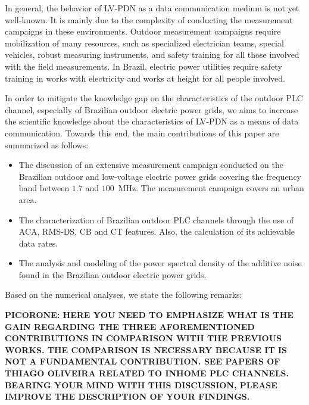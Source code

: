 \documentclass[journal]{IEEEtran}
\begin{document}
	\color{red} In general, the behavior of \ac{LV-PDN} as a data communication medium is not yet well-known. It is mainly due to the complexity of conducting the measurement campaigns in these environments. Outdoor measurement campaigns require mobilization of many resources, such as specialized electrician teams, special vehicles, robust measuring instruments, and safety training for all those involved with the field measurements. In Brazil, electric power utilities require safety training in works with electricity \cite{NR10} and works at height \cite{NR35} for all people involved. 
	
	In order to mitigate the knowledge gap on the characteristics of the outdoor PLC channel, especially of Brazilian outdoor electric power grids, we aims to increase the scientific knowledge about the characteristics of \ac{LV-PDN} as a means of data communication. Towards this end, the main contributions of this paper are summarized as follows:\color{black}
	\begin{itemize}
		\item The discussion of an extensive measurement campaign conducted on the Brazilian outdoor and low-voltage electric power grids covering the frequency band between $1.7$ and $100$~MHz. The measurement campaign covers an urban area.	
		\item The characterization of Brazilian outdoor \ac{PLC} channels through the use of  \ac{ACA}, \ac{RMS-DS}, \ac{CB} and \ac{CT} features. Also, the calculation of its achievable data rates.
		\item The analysis and modeling of the power spectral density of the additive noise found in the Brazilian outdoor electric power grids. 
	\end{itemize}
	
	
	
	
	Based on the numerical analyses, we state the following remarks:
	
	\textbf{PICORONE: HERE YOU NEED TO EMPHASIZE WHAT IS THE GAIN REGARDING THE THREE AFOREMENTIONED CONTRIBUTIONS IN COMPARISON WITH THE PREVIOUS WORKS. THE COMPARISON IS NECESSARY BECAUSE IT IS NOT A FUNDAMENTAL CONTRIBUTION. SEE PAPERS OF THIAGO OLIVEIRA RELATED TO INHOME PLC CHANNELS. BEARING YOUR MIND WITH THIS DISCUSSION, PLEASE IMPROVE THE DESCRIPTION OF YOUR FINDINGS.}
	
\end{document}
